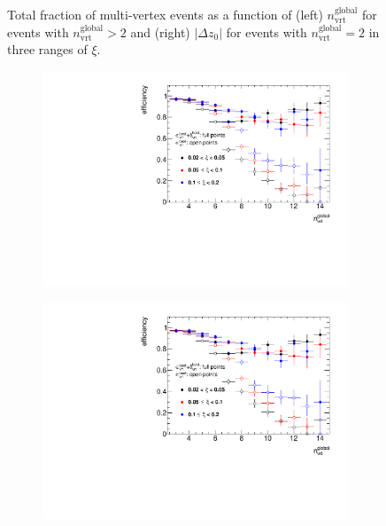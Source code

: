 \begin{figure}[h!]
\begin{subfigure}{.47\textwidth}
	\end{subfigure}
	\caption{Total fraction of multi-vertex events as a function of (left) $n_\textrm{vrt}^\textrm{global}$ for events with $n^\textrm{global}_\textrm{vrt}>2$ and (right) $|\Delta z_0|$ for events with $n^\textrm{global}_\textrm{vrt}=2$  in three ranges of $\xi$.}
		\label{fig:vertexVetoDZ}
\end{figure}
\begin{figure}[h!]
	\centering
	\begin{subfigure}{.47\textwidth}
		\includegraphics[width=\textwidth,page=3]{chapters/chrgSTAR/img/vertex/vertexEffi_ksi.pdf}
	\end{subfigure}
	\begin{subfigure}{.47\textwidth}
		\includegraphics[width=\textwidth,page=4]{chapters/chrgSTAR/img/vertex/vertexEffi_ksi.pdf}

\end{subfigure}
\end{figure}
